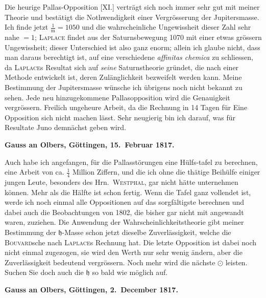 \documentclass[12pt,a4paper]{article}
\newcommand{\Ceres}{\odot}
\newcommand{\Jupiter}{\mathfrak{h}}
\begin{document}
Die heurige Pallas-Opposition [XI.] verträgt sich noch immer sehr gut mit meiner Theorie und bestätigt die Nothwendigkeit einer Vergrösserung der Jupitersmasse. Ich finde jetzt $\frac{1}{\text{m}} = 1050$ und die wahrscheinliche Ungewissheit dieser Zahl sehr nahe $= 1$; \textsc{Laplace} findet aus der Saturnsbewegung 1070 mit einer etwas grössern Ungewissheit; dieser Unterschied ist also ganz enorm; allein ich glaube nicht, dass man daraus berechtigt ist, auf eine verschiedene \textit{affinitas chemica} zu schliessen, da \textsc{Laplace}s Resultat sich auf \textit{seine} Saturnstheorie gründet, die nach einer Methode entwickelt ist, deren Zulänglichkeit bezweifelt werden kann. Meine Bestimmung der Jupitersmasse wünsche ich übrigens noch nicht bekannt zu sehen. Jede neu hinzugekommene Pallasopposition wird die Genauigkeit vergrössern. Freilich ungeheure Arbeit, da die Rechnung in 14 Tagen für Eine Opposition sich nicht machen lässt. Sehr neugierig bin ich darauf, was für Resultate Juno demnächst geben wird.

\medskip\noindent
\textbf{Gauss an Olbers, Göttingen, 15.~Februar 1817.}

Auch habe ich angefangen, für die Pallasstörungen eine Hülfs-\n tafel zu berechnen, eine Arbeit von ca. $\frac{1}{4}$ Million Ziffern, und die ich ohne die thätige Beihülfe einiger jungen Leute, besonders des Hrn.~\textsc{Westphal}, gar nicht hätte unternehmen können. Mehr als die Hälfte ist schon fertig. Wenn die Tafel ganz vollendet ist, werde ich noch einmal alle Oppositionen auf das sorgfältigste berechnen und dabei auch die Beobachtungen von 1802, die bisher gar nicht mit angewandt waren, zuziehen. Die Anwendung der Wahrscheinlichkeitstheorie gibt meiner Bestimmung der $\Jupiter$-Masse schon jetzt dieselbe Zuverlässigkeit, welche die \textsc{Bouvard}sche nach \textsc{Laplace}s Rechnung hat. Die letzte Opposition ist dabei noch nicht einmal zugezogen, sie wird den Werth nur sehr wenig ändern, aber die Zuverlässigkeit bedeutend vergrössern. Noch mehr wird die nächste $\Ceres$ leisten. Suchen Sie doch auch die $\Jupiter$ so bald wie möglich auf.

\newpage
\setcounter{page}{439}
%
\medskip\noindent
\textbf{Gauss an Olbers, Göttingen, 2.~December 1817.}
\end{document}
